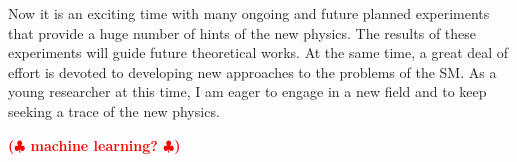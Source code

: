 \documentclass[12pt,notitlepage]{article}
\def\rem#1{ {\bf\textcolor{red}{($\clubsuit$ #1 $\clubsuit$)}}}
\begin{document}
Now it is an exciting time with many ongoing and future planned experiments that provide a huge number of hints of the new physics.
The results of these experiments will guide future theoretical works.
At the same time, a great deal of effort is devoted to developing new approaches to the problems of the SM.
As a young researcher at this time, I am eager to engage in a new field and to keep seeking a trace of the new physics.

\rem{machine learning?}
\end{document}
